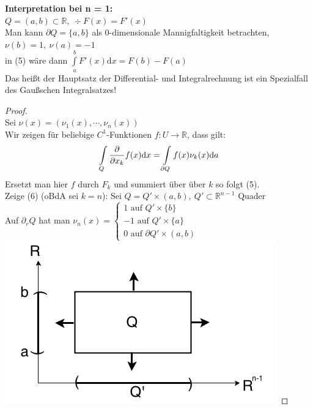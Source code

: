 \textbf{Interpretation bei n = 1:}\\
$Q = (a,b) \subset \mathbb{R}, \ \div  F(x) = F'(x) $ \\
Man kann $\partial Q = \lbrace a, b \rbrace $ 
als 0-dimensionale Mannigfaltigkeit betrachten,\\
$\nu(b) = 1, \ \nu(a) = -1 $\\
in (5) wäre dann
$\int\limits_a^b F'(x) \mathrm{d}x = F(b) - F(a) $\\
Das heißt der Hauptsatz der Differential- und Integralrechnung ist
ein Spezialfall des Gaußschen Integralsatzes!

\begin{proof}
\mbox{} \\
Sei $\nu(x) = (\nu_1(x), \cdots, \nu_n(x)) $\\
Wir zeigen für beliebige $C^1$-Funktionen $f: U \rightarrow \mathbb{R} $,
dass gilt: \\
\begin{equation}
    \int\limits_Q \frac{\partial{}}{\partial{x_k}} f(x) \mathrm{d}x =
    \int\limits_{\partial Q} f(x) \nu_k (x) \mathrm{d}a
\end{equation}
Ersetzt man hier $f$ durch $F_k$ und summiert über über $k$ so folgt (5).\\
Zeige (6) (oBdA sei $k=n$):
Sei $Q = Q' \times (a,b), \ Q' \subset \mathbb{R}^{n-1} $ Quader\\
Auf $\partial_r Q $ hat man
$\nu_n (x) = 
\begin{cases}
    1 \text{ auf } Q' \times \lbrace b \rbrace \\
    -1 \text{ auf } Q' \times \lbrace a \rbrace \\
    0 \text{ auf } \partial Q' \times (a,b)
\end{cases}
$
\includegraphics[scale=0.3]{pictures/007-04}


\end{proof}
